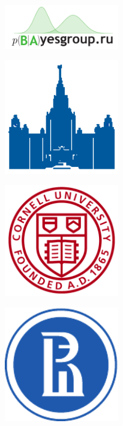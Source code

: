 \documentclass[a0,portrait]{a0poster}
\begin{document}
\begin{minipage}[b]{0.15\linewidth}
  \begin{minipage}[b]{0.49\linewidth}
  \begin{center}
    \centering
  \includegraphics[width=5cm]{pics/logos/bayesgroup.pdf}
  \vspace{0.5cm}
  \end{center}
  \end{minipage}
  \begin{minipage}[b]{0.49\linewidth}
  \begin{center}
    \centering
    \includegraphics[width=5cm]{pics/logos/msu_blue.eps}
  \end{center}
  \vspace{0.5cm}
  \end{minipage}
  \begin{minipage}[b]{0.49\linewidth}
  \begin{center}
    \centering
  \includegraphics[width=5cm]{pics/logos/cornell.png}
  \end{center}
  \end{minipage}
  \begin{minipage}[b]{0.49\linewidth}
  \begin{center}
    \centering
    \includegraphics[width=5cm]{pics/logos/hse.pdf}
  \end{center}
  \end{minipage}
\end{minipage}
\end{document}
